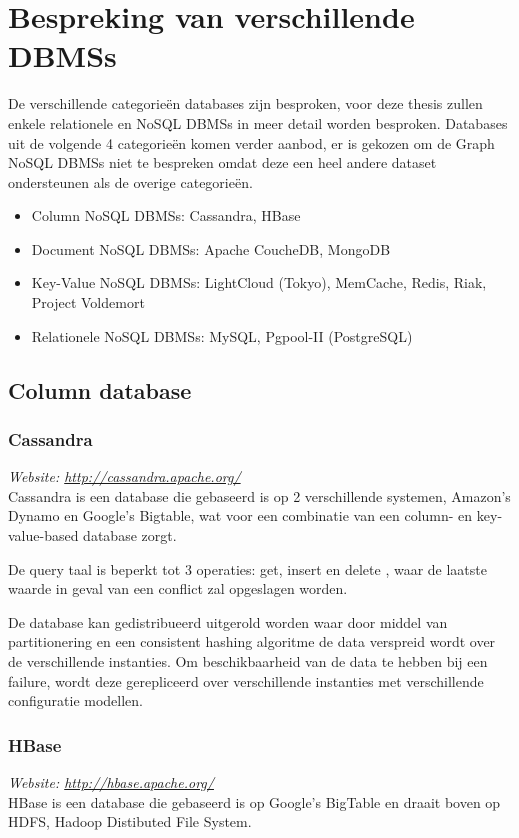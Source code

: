 \section{Bespreking van verschillende \glspl{DBMS}}\label{sec:BesprekingDBMS}
De verschillende categorieën databases zijn besproken, voor deze thesis zullen enkele relationele en NoSQL \glspl{DBMS} in meer detail worden besproken. Databases uit de volgende 4 categorieën komen verder aanbod, er is gekozen om de Graph NoSQL \glspl{DBMS} niet te bespreken omdat deze een heel andere dataset ondersteunen als de overige categorieën. 
\begin{itemize}
\item Column NoSQL \glspl{DBMS}: Cassandra, HBase
\item Document NoSQL \glspl{DBMS}: Apache CoucheDB, MongoDB
\item Key-Value NoSQL \glspl{DBMS}: LightCloud (Tokyo), MemCache, Redis, Riak, Project Voldemort
\item Relationele NoSQL \glspl{DBMS}: MySQL, Pgpool-II (PostgreSQL)
\end{itemize}

\subsection{Column database}
\subsubsection{Cassandra}
\textit{Website: \url{http://cassandra.apache.org/}}\\
Cassandra is een database die gebaseerd is op 2 verschillende systemen, Amazon's Dynamo en Google's Bigtable, wat voor een combinatie van een column- en key-value-based database zorgt. 

De query taal is beperkt tot 3 operaties: get, insert en delete \cite{Lakshman:2010:CDS:1773912.1773922}, waar de  laatste waarde in geval van een conflict zal opgeslagen worden.

De database kan gedistribueerd uitgerold worden waar door middel van partitionering en een consistent hashing algoritme de data verspreid wordt over de verschillende instanties. Om beschikbaarheid van de data te hebben bij een failure, wordt deze gerepliceerd over verschillende instanties met verschillende configuratie modellen. 

\subsubsection{HBase}
\textit{Website: \url{http://hbase.apache.org/}}\\
HBase is een database die gebaseerd is op Google's BigTable en draait boven op HDFS, Hadoop Distibuted File System.


